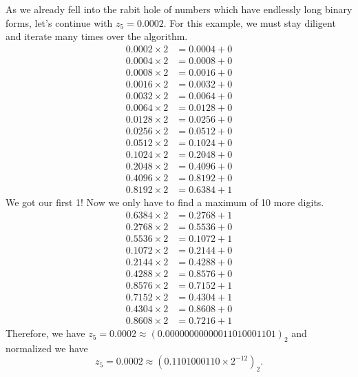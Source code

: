 \begin{exmp}
    As we already fell into the rabit hole of numbers which have endlessly long binary forms, let's continue with \(z_5 = 0.0002\). For this example, we must stay diligent and iterate many times over the algorithm.
    \begin{align*}
        0.0002 \times 2 &= 0.0004 + 0 \\
        0.0004 \times 2 &= 0.0008 + 0 \\
        0.0008 \times 2 &= 0.0016 + 0 \\
        0.0016 \times 2 &= 0.0032 + 0 \\
        0.0032 \times 2 &= 0.0064 + 0 \\
        0.0064 \times 2 &= 0.0128 + 0 \\
        0.0128 \times 2 &= 0.0256 + 0 \\
        0.0256 \times 2 &= 0.0512 + 0 \\
        0.0512 \times 2 &= 0.1024 + 0 \\
        0.1024 \times 2 &= 0.2048 + 0 \\
        0.2048 \times 2 &= 0.4096 + 0 \\
        0.4096 \times 2 &= 0.8192 + 0 \\
        0.8192 \times 2 &= 0.6384 + 1
    \end{align*}
    We got our first 1! Now we only have to find a maximum of 10 more digits.
    \begin{align*}
        0.6384 \times 2 &= 0.2768 + 1 \\
        0.2768 \times 2 &= 0.5536 + 0 \\
        0.5536 \times 2 &= 0.1072 + 1 \\
        0.1072 \times 2 &= 0.2144 + 0 \\
        0.2144 \times 2 &= 0.4288 + 0 \\
        0.4288 \times 2 &= 0.8576 + 0 \\
        0.8576 \times 2 &= 0.7152 + 1 \\
        0.7152 \times 2 &= 0.4304 + 1 \\
        0.4304 \times 2 &= 0.8608 + 0 \\
        0.8608 \times 2 &= 0.7216 + 1
    \end{align*}
    Therefore, we have \(z_5 = 0.0002 \approx (0.00000000000011010001101)_2\) and normalized we have
    \begin{equation*}
        z_5 = 0.0002 \approx (0.1101000110 \times 2^{-12})_2 \text{.}
    \end{equation*}
    
\end{exmp}
